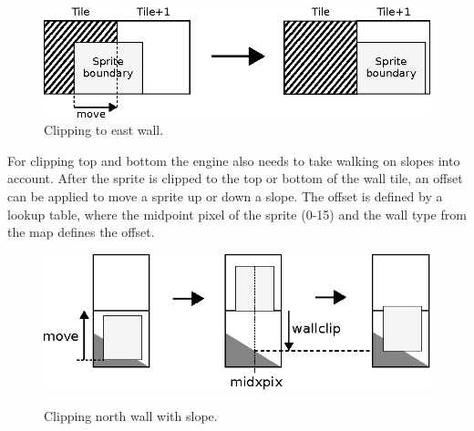 \documentclass[book.tex]{subfiles}
\begin{document}
\begin{figure}[H]
  \centering
  \includegraphics[width=\textwidth]{imgs/drawings/clipping_east.eps}
  \caption{Clipping to east wall.}
  \label{fig:clipping_east}  
\end{figure}

\par
\begin{minipage}{\textwidth}
  
\end{minipage}
\label{wallclip_array}
\par
For clipping top and bottom the engine also needs to take walking on slopes into account. After the sprite is clipped to the top or bottom of the wall tile, an offset can be applied to move a sprite up or down a slope. The offset is defined by a lookup table, where the midpoint pixel of the sprite (0-15) and the wall type from the map defines the offset.

\begin{figure}[H]
  \centering
  \includegraphics[width=\textwidth]{imgs/drawings/clipping_north.eps}
  \label{fig:clipping_north}
  \caption{Clipping north wall with slope.}
\end{figure}
\end{document}
